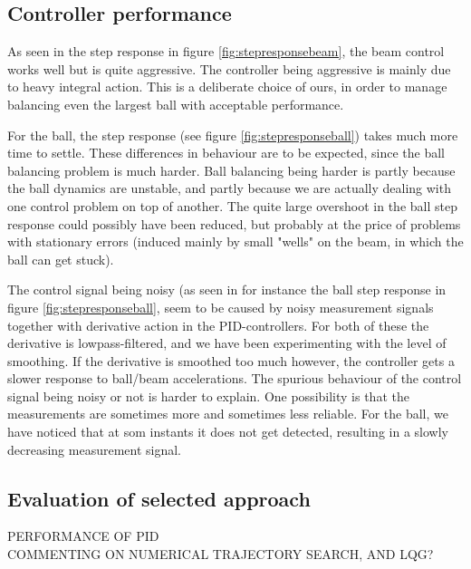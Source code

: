 
\subsection{Controller performance}
As seen in the step response in figure \ref{fig:stepresponsebeam}, the beam control works well but is quite aggressive.
The controller being aggressive is mainly due to heavy integral action.
This is a deliberate choice of ours, in order to manage balancing even the largest ball with acceptable performance.

For the ball, the step response (see figure \ref{fig:stepresponseball}) takes much more time to settle.
These differences in behaviour are to be expected, since the ball balancing problem is much harder.
Ball balancing being harder is partly because the ball dynamics are unstable, and partly because we are actually dealing with one control problem on top of another.
The quite large overshoot in the ball step response could possibly have been reduced, but probably at the price of problems with stationary errors (induced mainly by small "wells" on the beam, in which the ball can get stuck).

The control signal being noisy (as seen in for instance the ball step response in figure \ref{fig:stepresponseball}, seem to be caused by noisy measurement signals together with derivative action in the PID-controllers.
For both of these the derivative is lowpass-filtered, and we have been experimenting with the level of smoothing. If the derivative is smoothed too much however, the controller gets a slower response to ball/beam accelerations.
The spurious behaviour of the control signal being noisy or not is harder to explain.
One possibility is that the measurements are sometimes more and sometimes less reliable.
For the ball, we have noticed that at som instants it does not get detected, resulting in a slowly decreasing measurement signal.

\subsection{Evaluation of selected approach}
PERFORMANCE OF PID \\
COMMENTING ON NUMERICAL TRAJECTORY SEARCH, AND LQG? \\
